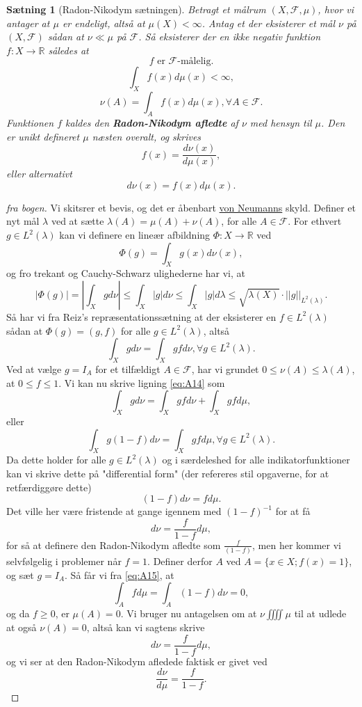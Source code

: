 \documentclass[12pt]{report}
\newtheorem{theorem}[lemma]{Sætning}
\theoremstyle{break}
\newtheorem*{proof}{Bevis}
\theoremstyle{break}
\newcommand{\RR}{\mathbb{R}}
\newcommand{\FI}{\mathcal{F}}
\begin{document}
\begin{theorem}[Radon-Nikodym sætningen]
	 Betragt et målrum $(X,\FI,\mu)$, hvor vi antager at $\mu$ er endeligt, altså at  $\mu(X)<\infty$. Antag et der eksisterer et mål $\nu$ på $(X,\FI)$ sådan at $\nu \ll \mu$ på $\FI$. Så eksisterer der en ikke negativ funktion $f\colon X\to \RR$ således at
	 \[ f \text{ er }\FI\text{-målelig.} \]
	 \[ \int_X f(x)d\mu(x)<\infty, \]
	 \[ \nu(A)=\int_A f(x)d\mu(x), \forall A\in \FI .\]
	 Funktionen $f$ kaldes den {\bf Radon-Nikodym afledte} af $\nu$ med hensyn til $\mu$. Den er unikt defineret $\mu$ næsten overalt, og skrives
	 \[ f(x)=\frac{d\nu(x)}{d\mu(x)}, \]
	 eller alternativt
	 \[ d\nu(x)=f(x)d\mu(x). \]
\end{theorem}
\begin{proof}[fra bogen]
	Vi skitsrer et bevis, og det er åbenbart \href{https://en.wikipedia.org/wiki/John_von_Neumann}{von Neumanns} skyld. Definer et nyt mål $\lambda$ ved at sætte $\lambda(A) = \mu(A)+\nu(A)$, for alle $A\in \FI$. For ethvert $g\in L^2(\lambda)$ kan vi definere en lineær afbildning $\Phi \colon X \to \RR$ ved
	\[ \Phi(g)=\int_Xg(x)d\nu(x), \]
	og fro trekant og Cauchy-Schwarz ulighederne har vi, at
	\[ |\Phi(g)|=\left\vert \int_X gd\nu\right\vert \leq \int_X |g|d\nu \leq \int_X |g|d\lambda \leq \sqrt{\lambda(X)}\cdot ||g||_{L^2(\lambda)}. \] 
	Så har vi fra Reiz's repræsentationssætning at der eksisterer en $f\in L^2(\lambda)$ sådan at $\Phi(g)=(g,f)$ for alle $g\in L^2(\lambda)$, altså
	\begin{equation}
		\int_X gd\nu=\int_X gfd\nu, \forall g\in L^2(\lambda).\label{eq:A14}
	\end{equation}
	Ved at vælge $g=I_A$ for et tilfældigt $A\in \FI$, har vi grundet $0\leq \nu(A)\leq\lambda(A)$, at $0\leq f \leq 1$. Vi kan nu skrive ligning \ref{eq:A14} som
	\[ \int_Xgd\nu=\int_X gfd\nu+\int_X gfd\mu, \]
	eller
	\begin{equation}
		\int_X g(1-f)d\nu=\int_X gfd\mu, \forall g\in L^2(\lambda). \label{eq:A15}
	\end{equation}
	Da dette holder for alle $g\in L^2(\lambda)$ og i særdeleshed for alle indikatorfunktioner kan vi skrive dette på "differential form" (der refereres stil opgaverne, for at retfærdiggøre dette)
	\[ (1-f)d\nu=fd\mu. \]
	Det ville her være fristende at gange igennem med $(1-f)^{-1}$ for at få
	\[ d\nu=\frac{f}{1-f}d\mu, \]
	for så at definere den Radon-Nikodym afledte som $\frac{f}{(1-f)}$, men her kommer vi selvfølgelig i problemer når $f=1$. Definer derfor $A$ ved $A=\{ x\in X;f(x)=1 \}$, og sæt $g=I_A$. Så får vi fra \ref{eq:A15}, at
	\[ \int_A fd\mu=\int_A(1-f)d\nu=0, \]
	og da $f\geq 0$, er $\mu(A)=0$. Vi bruger nu antagelsen om at $\nu\iiiint\mu$ til at udlede at også $\nu(A)=0$, altså kan vi sagtens skrive
	\[ d\nu=\frac{f}{1-f}d\mu, \]
	og vi ser at den Radon-Nikodym afledede faktisk er givet ved
	\[ \frac{d\nu}{d\mu}=\frac{f}{1-f}.\]
\end{proof}
\end{document}
